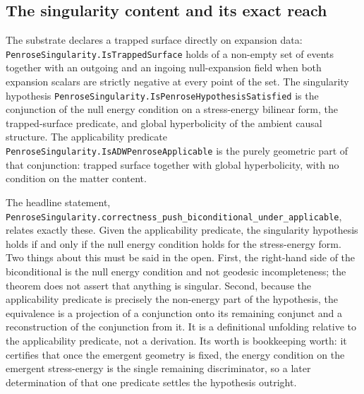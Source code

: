 \documentclass[aps,prd,nofootinbib,superscriptaddress,12pt]{revtex4-2}
\DeclareRobustCommand{\lb}{\discretionary{}{}{}}
\begin{document}
\subsection{The singularity content and its exact reach}
\label{sec:bh-theorems-penrose}

The substrate declares a trapped surface directly on expansion data:
\texttt{Penrose\lb{}Singularity.\lb{}Is\lb{}Trapped\lb{}Surface} holds of a non-empty set of events
together with an outgoing and an ingoing null-expansion field when both
expansion scalars are strictly negative at every point of the set. The
singularity hypothesis \texttt{Penrose\lb{}Singularity.\lb{}Is\lb{}Penrose\lb{}Hypothesis\lb{}Satisfied}
is the conjunction of the null energy condition on a stress-energy bilinear form,
the trapped-surface predicate, and global hyperbolicity of the ambient causal
structure. The applicability predicate
\texttt{Penrose\lb{}Singularity.\lb{}Is\lb{}ADWPenrose\lb{}Applicable} is the purely geometric part
of that conjunction: trapped surface together with global hyperbolicity, with no
condition on the matter content.

The headline statement,
\texttt{Penrose\lb{}Singularity.\lb{}correctness\_\lb{}push\_\lb{}biconditional\_\lb{}under\_\lb{}applicable},
relates exactly these. Given the applicability predicate, the singularity
hypothesis holds if and only if the null energy condition holds for the
stress-energy form. Two things about this must be said in the open. First, the
right-hand side of the biconditional is the null energy condition and not
geodesic incompleteness; the theorem does not assert that anything is singular.
Second, because the applicability predicate is precisely the non-energy part of
the hypothesis, the equivalence is a projection of a conjunction onto its
remaining conjunct and a reconstruction of the conjunction from it. It is a
definitional unfolding relative to the applicability predicate, not a derivation.
Its worth is bookkeeping worth: it certifies that once the emergent geometry is
fixed, the energy condition on the emergent stress-energy is the single remaining
discriminator, so a later determination of that one predicate settles the
hypothesis outright.
\end{document}

